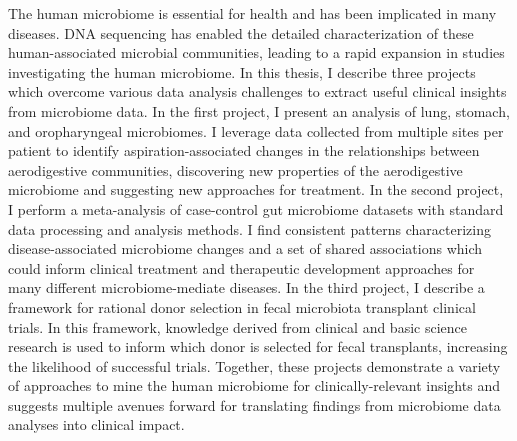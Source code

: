 
The human microbiome is essential for health and has been implicated in many diseases.
DNA sequencing has enabled the detailed characterization of these human-associated microbial communities, leading to a rapid expansion in studies investigating the human microbiome.
In this thesis, I describe three projects which overcome various data analysis challenges to extract useful clinical insights from microbiome data.
In the first project, I present an analysis of lung, stomach, and oropharyngeal microbiomes.
I leverage data collected from multiple sites per patient to identify aspiration-associated changes in the relationships between aerodigestive communities, discovering new properties of the aerodigestive microbiome and suggesting new approaches for treatment.
In the second project, I perform a meta-analysis of case-control gut microbiome datasets with standard data processing and analysis methods.
I find consistent patterns characterizing disease-associated microbiome changes and a set of shared associations which could inform clinical treatment and therapeutic development approaches for many different microbiome-mediate diseases.
In the third project, I describe a framework for rational donor selection in fecal microbiota transplant clinical trials.
In this framework, knowledge derived from clinical and basic science research is used to inform which donor is selected for fecal transplants, increasing the likelihood of successful trials.
Together, these projects demonstrate a variety of approaches to mine the human microbiome for clinically-relevant insights and suggests multiple avenues forward for translating findings from microbiome data analyses into clinical impact.

